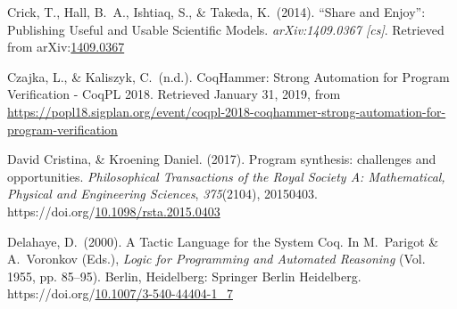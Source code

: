 \documentclass[12pt,twoside]{article}
\begin{document}
{\begin{thebibliography}{222}
Crick, T., Hall, B.~A., Ishtiaq, S., \& Takeda, K.~(2014). \textquotedblleft{}Share and Enjoy\textquotedblright{}: Publishing Useful and Usable Scientific Models. \emph{arXiv:1409.0367 {}[cs]}. Retrieved from arXiv:\href{http://arxiv.org/abs/1409.0367}{1409.0367}\label{crick_share_2014}%

Czajka, L., \& Kaliszyk, C.~(n.d.). CoqHammer: Strong Automation for Program Verification - CoqPL 2018. Retrieved January 31, 2019, from \href{https://popl18.sigplan.org/event/coqpl-2018-coqhammer-strong-automation-for-program-verification}{{\ttfamily https://\hspace{0pt}popl18.\hspace{0pt}sigplan.\hspace{0pt}org/\hspace{0pt}event/\hspace{0pt}coqpl-\hspace{0pt}2018-\hspace{0pt}coqhammer-\hspace{0pt}strong-\hspace{0pt}automation-\hspace{0pt}for-\hspace{0pt}program-\hspace{0pt}verification}}\label{czajka_coqhammer:_nodate}%

David Cristina, \& Kroening Daniel. (2017). Program synthesis: challenges and opportunities. \emph{Philosophical Transactions of the Royal Society A: Mathematical, Physical and Engineering Sciences}, \emph{375}(2104), 20150403. https://doi.org/\href{https://dx.doi.org/10.1098/rsta.2015.0403}{10.1098/rsta.2015.0403}\label{david_cristina_program_2017}%

\mdbibitemlabel{[Delahaye, 2000]}Delahaye, D.~(2000). A Tactic Language for the System Coq. In M.~Parigot \& A.~Voronkov (Eds.), \emph{Logic for Programming and Automated Reasoning} (Vol. 1955, pp. 85–95). Berlin, Heidelberg: Springer Berlin Heidelberg. https://doi.org/\href{https://dx.doi.org/10.1007/3-540-44404-1_7}{10.1007/3-540-44404-1\_7}\label{parigot_tactic_2000}%


\end{thebibliography}}
\end{document}
